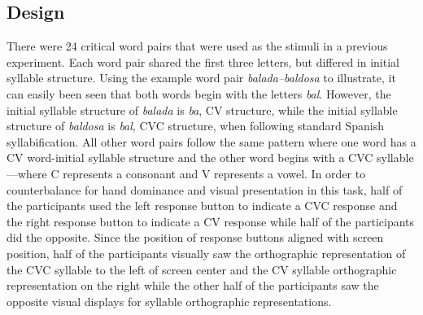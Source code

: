 \subsection{Design}
There were 24 critical word pairs that were used as the stimuli in a previous experiment. Each word pair shared the first three letters, but differed in initial syllable structure. Using the example word pair \emph{balada–baldosa} to illustrate, it can easily been seen that both words begin with the letters \emph{bal}. However, the initial syllable structure of \emph{balada} is \emph{ba}, CV structure, while the initial syllable structure of \emph{baldosa} is \emph{bal}, CVC structure, when following standard Spanish syllabification. All other word pairs follow the same pattern where one word has a CV word-initial syllable structure and the other word begins with a CVC syllable---where C represents a consonant and V represents a vowel. In order to counterbalance for hand dominance and visual presentation in this task, half of the participants used the left response button to indicate a CVC response and the right response button to indicate a CV response while half of the participants did the opposite. Since the position of response buttons aligned with screen position, half of the participants visually saw the orthographic representation of the CVC syllable to the left of screen center and the CV syllable orthographic representation on the right while the other half of the participants saw the opposite visual displays for syllable orthographic representations.


